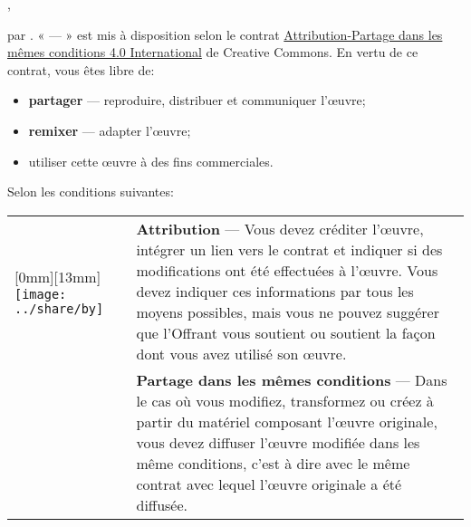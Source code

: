 \raisebox{-2.5mm}{%
  \texttt{[image: by-sa]}} %
{\theauthor}, {\year}

{\textcopyright} {\year} par {\theauthor}. «{\thetitle} --- {\theparttitle}»
est mis à disposition selon le contrat
\href{http://creativecommons.org/licenses/by-sa/4.0/deed.fr}{%
  Attribution-Partage dans les mêmes conditions 4.0 International} de
Creative Commons. En vertu de ce contrat, vous êtes libre de:
\begin{itemize}
\item \textbf{partager} --- reproduire, distribuer et communiquer
  l'œuvre;
\item \textbf{remixer} --- adapter l'œuvre;
\item utiliser cette œuvre à des fins commerciales.
\end{itemize}
Selon les conditions suivantes:

\begin{tabularx}{\linewidth}{@{}lX@{}}
  \raisebox{-9mm}[0mm][13mm]{%
    \texttt{[image: ../share/by]}} &
  \textbf{Attribution} --- Vous devez créditer l'œuvre, intégrer
  un lien vers le contrat et indiquer si des modifications ont été
  effectuées à l'œuvre. Vous devez indiquer ces informations par
  tous les moyens possibles, mais vous ne pouvez suggérer que
  l'Offrant vous soutient ou soutient la façon dont vous avez utilisé
  son œuvre. \\
  \raisebox{-9mm}{\texttt{[image: ../share/sa]}}
  & \textbf{Partage dans les mêmes conditions} --- Dans le cas où vous
  modifiez, transformez ou créez à partir du matériel composant
  l'œuvre originale, vous devez diffuser l'œuvre modifiée dans
  les même conditions, c'est à dire avec le même contrat avec lequel
  l'œuvre originale a été diffusée.
\end{tabularx}

